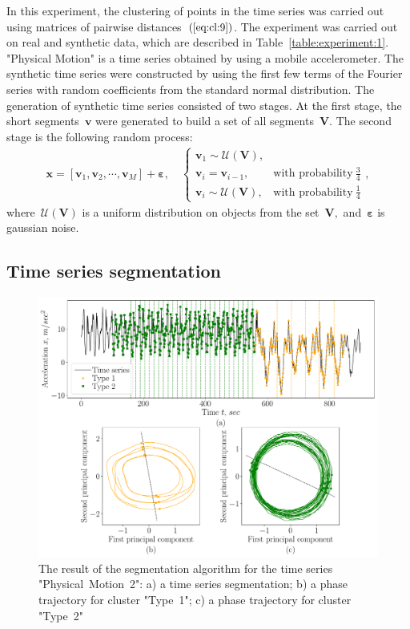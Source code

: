 \documentclass[12pt, twoside]{article}
\numberwithin{equation}{section}
\begin{document}
In this experiment, the clustering of points in the time series was carried out using matrices of pairwise distances~$(\ref{eq:cl:9})$. 
The experiment was carried out on real and synthetic data, which are described in Table~\ref{table:experiment:1}. 
"Physical Motion" is a time series obtained by using a mobile accelerometer. 
The synthetic time series were constructed by using the first few terms of the Fourier series with random coefficients from the standard normal distribution.
The generation of synthetic time series consisted of two stages.
At the first stage, the short segments~$\textbf{v}$ were generated to build a set of all segments~$\mathbf{V}$.
The second stage is the following random process:
\begin{equation}
\label{eq:exp:1}
\begin{aligned}
\textbf{x} = [\textbf{v}_{1}, \textbf{v}_{2}, \cdots, \textbf{v}_{M}] + \bm{\varepsilon}, \quad \begin{cases}
    \textbf{v}_{1} \sim \mathcal{U}\left(\mathbf{V}\right),\\
    \textbf{v}_{i} = \textbf{v}_{i - 1}, & \text{with probability}~\frac{3}{4}\\
    \textbf{v}_{i} \sim \mathcal{U}\left(\mathbf{V}\right), & \text{with probability}~\frac{1}{4}
\end{cases},
\end{aligned}
\end{equation}
where~$\mathcal{U}\left(\mathbf{V}\right)$ is a uniform distribution on objects from the set~$\mathbf{V},$ and~$\bm{\varepsilon}$ is gaussian noise.

\subsection{Time series segmentation}
\begin{figure}[h!t]\center
\includegraphics[width=1\textwidth]{results_eng/experiment_segmentation}
\caption{The result of the segmentation algorithm for the time series "Physical~Motion~2": 
a) a time series segmentation; b) a phase trajectory for cluster "Type~1"; c) a phase trajectory for cluster "Type~2"}
\label{fig:experiment:2}
\end{figure}
\end{document}
